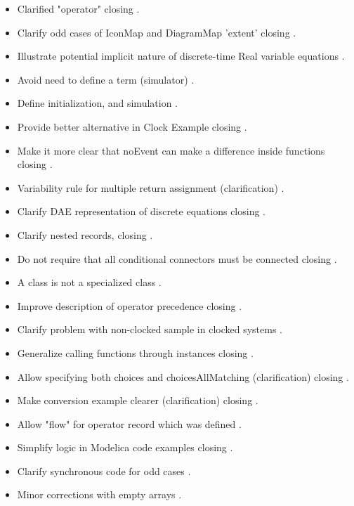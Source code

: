 \begin{itemize}
\item Clarified "operator"  closing .
\item Clarify odd cases of IconMap and DiagramMap 'extent'  closing .
\item Illustrate potential implicit nature of discrete-time Real variable equations .
\item Avoid need to define a term (simulator) .
\item Define initialization, and simulation .
\item Provide better alternative in Clock Example  closing .
\item Make it more clear that noEvent can make a difference inside functions  closing .
\item Variability rule for multiple return assignment (clarification) .
\item Clarify DAE representation of discrete equations  closing .
\item Clarify nested records,  closing .
\item Do not require that all conditional connectors must be connected  closing .
\item A class is not a specialized class .
\item Improve description of operator precedence  closing .
\item Clarify problem with non-clocked sample in clocked systems .
\item Generalize calling functions through instances  closing .
\item Allow specifying both choices and choicesAllMatching (clarification)  closing .
\item Make conversion example clearer (clarification)  closing .
\item Allow "flow" for operator record which was defined .
\item Simplify logic in Modelica code examples  closing .
\item Clarify synchronous code for odd cases .
\item Minor corrections with empty arrays .

\end{itemize}
